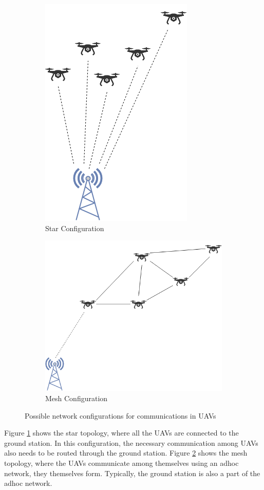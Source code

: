 \begin{figure}
	\centering
	\begin{subfigure}[b]{0.3\textwidth}
		\centering
		\includegraphics[scale=0.45]{Pictures/star.png}
		\caption{Star Configuration}
		\label{fig: starconf}
	\end{subfigure}
	\begin{subfigure}[b]{0.3\textwidth}
		\centering
		\includegraphics[scale=0.45]{Pictures/mesh.png}
		\caption{Mesh Configuration}
		\label{fig: meshconf}
	\end{subfigure}
	\caption{Possible network configurations for communications in UAVs}
	\label{fig: netconf}
\end{figure}

Figure \ref{fig: starconf} shows the star topology, where all the UAVs are connected to the ground station. In this configuration, the necessary communication among UAVs also needs to be routed through the ground station. Figure \ref{fig: meshconf} shows the mesh topology, where the UAVs communicate among themselves using an adhoc network, they themselves form. Typically, the ground station is also a part of the adhoc network.
